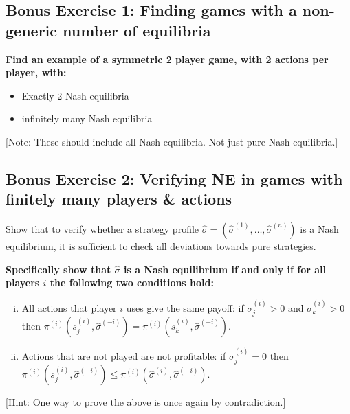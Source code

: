 \documentclass[10pt]{article}
\begin{document}
\subsection*{Bonus Exercise 1: Finding games with a non-generic number of equilibria}

\textbf{Find an example of a symmetric 2 player game, with 2 actions per player, with:}

\begin{itemize}
    \item Exactly 2 Nash equilibria
    \item infinitely many Nash equilibria
\end{itemize}

[Note: These should include all Nash equilibria. Not just pure Nash equilibria.]

\subsection*{Bonus Exercise 2: Verifying NE in games with finitely many players \& actions}

Show that to verify whether a strategy profile \(\hat{\sigma} =
(\hat{\sigma}^{(1)}, \dots, \hat{\sigma}^{(n)})\) is a Nash equilibrium, it is
sufficient to check all deviations towards pure strategies.

\textbf{Specifically show that \(\hat{\sigma}\) is a Nash equilibrium if and only if for
all players \(i\) the following two conditions hold:}

\begin{enumerate}[(i)]
    \item All actions that player \(i\) uses give the same payoff: if
    \(\sigma^{(i)}_j > 0\) and \(\sigma^{(i)}_k > 0\) then
    \(\pi^{(i)}(s^{(i)}_j, \hat{\sigma}^{(-i)}) = \pi^{(i)}(s^{(i)}_k,
    \hat{\sigma}^{(-i)})\).
    \item Actions that are not played are not profitable: if \(\sigma^{(i)}_j =
    0\) then \(\pi^{(i)}(s^{(i)}_j, \hat{\sigma}^{(-i)}) \leq
    \pi^{(i)}(\hat{\sigma}^{(i)}, \hat{\sigma}^{(-i)})\).
\end{enumerate}

[Hint: One way to prove the above is once again by contradiction.]
\end{document}
